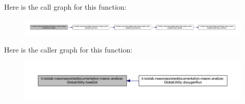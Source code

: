 Here is the call graph for this function\-:\nopagebreak
\begin{figure}[H]
\begin{center}
\leavevmode
\includegraphics[width=350pt]{classit_1_1isislab_1_1masonassisteddocumentation_1_1mason_1_1analizer_1_1_global_utility_a396066731dbc923fe85d28988511ba46_cgraph}
\end{center}
\end{figure}




Here is the caller graph for this function\-:\nopagebreak
\begin{figure}[H]
\begin{center}
\leavevmode
\includegraphics[width=350pt]{classit_1_1isislab_1_1masonassisteddocumentation_1_1mason_1_1analizer_1_1_global_utility_a396066731dbc923fe85d28988511ba46_icgraph}
\end{center}
\end{figure}



